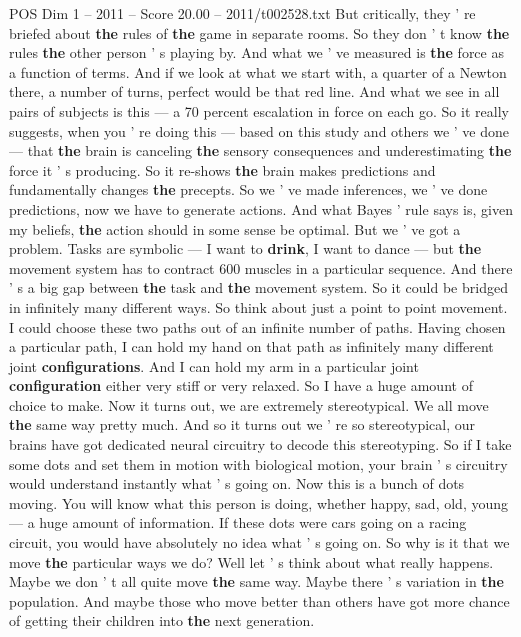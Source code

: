 \begin{textsample}{POS Dim 1 – 2011 – Score 20.00 – 2011/t002528.txt}
But critically, they ' re briefed about \textbf{the} rules of \textbf{the} game in separate rooms.
So they don ' t know \textbf{the} rules \textbf{the} other person ' s playing by.
And what we ' ve measured is \textbf{the} force as a function of terms.
And if we look at what we start with, a quarter of a Newton there, a number of turns, perfect would be that red line.
And what we see in all pairs of subjects is this — a 70 percent escalation in force on each go.
So it really suggests, when you ' re doing this — based on this study and others we ' ve done — that \textbf{the} brain is canceling \textbf{the} sensory consequences and underestimating \textbf{the} force it ' s producing.
So it re-shows \textbf{the} brain makes predictions and fundamentally changes \textbf{the} precepts.
So we ' ve made inferences, we ' ve done predictions, now we have to generate actions.
And what Bayes ' rule says is, given my beliefs, \textbf{the} action should in some sense be optimal.
But we ' ve got a problem.
Tasks are symbolic — I want to \textbf{drink}, I want to dance — but \textbf{the} movement system has to contract 600 muscles in a particular sequence.
And there ' s a big gap between \textbf{the} task and \textbf{the} movement system.
So it could be bridged in infinitely many different ways.
So think about just a point to point movement.
I could choose these two paths out of an infinite number of paths.
Having chosen a particular path, I can hold my hand on that path as infinitely many different joint \textbf{configurations}.
And I can hold my arm in a particular joint \textbf{configuration} either very stiff or very relaxed.
So I have a huge amount of choice to make.
Now it turns out, we are extremely stereotypical.
We all move \textbf{the} same way pretty much.
And so it turns out we ' re so stereotypical, our brains have got dedicated neural circuitry to decode this stereotyping.
So if I take some dots and set them in motion with biological motion, your brain ' s circuitry would understand instantly what ' s going on.
Now this is a bunch of dots moving.
You will know what this person is doing, whether happy, sad, old, young — a huge amount of information.
If these dots were cars going on a racing circuit, you would have absolutely no idea what ' s going on.
So why is it that we move \textbf{the} particular ways we do?
Well let ' s think about what really happens.
Maybe we don ' t all quite move \textbf{the} same way.
Maybe there ' s variation in \textbf{the} population.
And maybe those who move better than others have got more chance of getting their children into \textbf{the} next generation.

\end{textsample}
